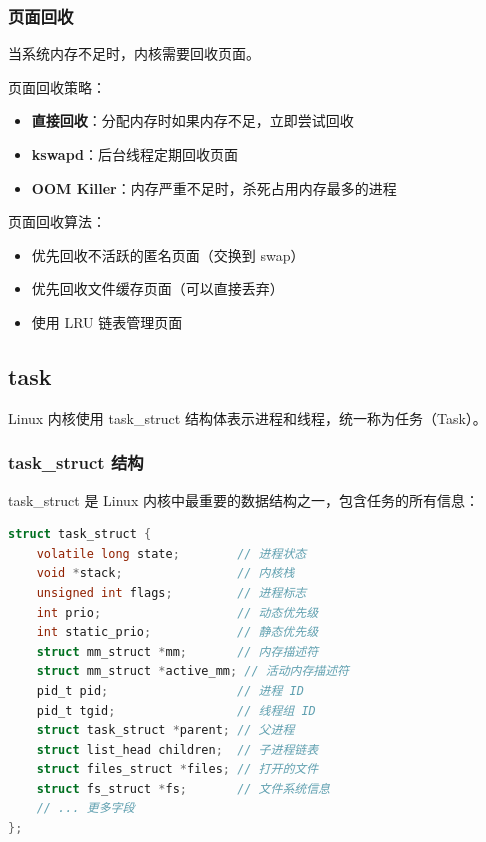 \subsubsection{页面回收}

当系统内存不足时，内核需要回收页面。

页面回收策略：
\begin{itemize}
  \item \textbf{直接回收}：分配内存时如果内存不足，立即尝试回收
  \item \textbf{kswapd}：后台线程定期回收页面
  \item \textbf{OOM Killer}：内存严重不足时，杀死占用内存最多的进程
\end{itemize}

页面回收算法：
\begin{itemize}
  \item 优先回收不活跃的匿名页面（交换到 swap）
  \item 优先回收文件缓存页面（可以直接丢弃）
  \item 使用 LRU 链表管理页面
\end{itemize}

\subsection{task}

Linux 内核使用 task\_struct 结构体表示进程和线程，统一称为任务（Task）。

\subsubsection{task\_struct 结构}


task\_struct 是 Linux 内核中最重要的数据结构之一，包含任务的所有信息：

\begin{lstlisting}[language=C]
struct task_struct {
    volatile long state;        // 进程状态
    void *stack;                // 内核栈
    unsigned int flags;         // 进程标志
    int prio;                   // 动态优先级
    int static_prio;            // 静态优先级
    struct mm_struct *mm;       // 内存描述符
    struct mm_struct *active_mm; // 活动内存描述符
    pid_t pid;                  // 进程 ID
    pid_t tgid;                 // 线程组 ID
    struct task_struct *parent; // 父进程
    struct list_head children;  // 子进程链表
    struct files_struct *files; // 打开的文件
    struct fs_struct *fs;       // 文件系统信息
    // ... 更多字段
};
\end{lstlisting}

